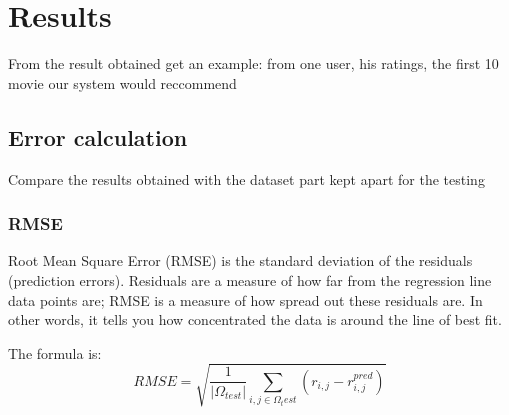 \documentclass{article}
\begin{document}
\section{Results}
From the result obtained get an example: from one user, his ratings, the first 10 movie our system would reccommend

\subsection{Error calculation}
Compare the results obtained with the dataset part kept apart for the testing

\subsubsection{RMSE}

Root Mean Square Error (RMSE) is the standard deviation of the residuals (prediction errors). Residuals are a measure of how far from the regression line data points are; RMSE is a measure of how spread out these residuals are. In other words, it tells you how concentrated the data is around the line of best fit. 

The formula is:
\begin{equation}
      RMSE = \sqrt{\frac{1}{|\Omega_{test}|}\sum_{i,j\in\Omega_test} (r_{i,j} - r_{i,j}^{pred})}
\end{equation}
\end{document}
